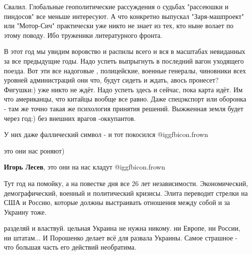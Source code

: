 \begin{itemize}
\begin{itemize}

Свалил. Глобальные геополитические рассуждения о судьбах "рассеюшки и пиндосов"
все меньше интересуют. А что конкретно выпускал "Заря-машпроект" или
"Мотор-Сич" практически уже никто не знает из тех, кто ныне волает по этому
поводу. Ибо труженики литературного фронта.

\end{itemize} %


В этот год мы увидим воровство и распилы всего и вся в масштабах невиданных за
все предыдущие годы. Надо успеть выпрыгнуть в последний вагон уходящего поезда.
Вот эти все надоговые , полицейские, военные генералы, чиновники всех уровней
администраций они что, будут сидеть и ждать, авось пронесет? Фигушки:) уже
никто не ждёт. Надо успеть здесь и сейчас, пока карта идёт. Им что американцы,
что китайцы вообще все равно. Даже спецэкспорт или оборонка - там же точно
такая же психология принятия решений. Выжженная земля будет через год:) без
внешних врагов -оккупантов.

У них даже фаллический символ - и тот покосился  @igg{fbicon.frown} 

\begin{itemize} %
это они нас роняют)

\textbf{Игорь Лесев}, это они на нас кладут  @igg{fbicon.frown} 
\end{itemize} %


Тут год на помойку, а на повестке дня все 26 лет независимости. Экономический,
демографический, военный и политический кризисы. Элита переводит стрелки на США
и Россию, которые должны выстраивать отношения между собой и за Украину тоже.


разделяй и властвуй. цельная Украина не нужна никому. ни Европе, ни России, ни
штатам... И Порошенко делает всё для развала Украины. Самое страшное - что
большая часть его действий необратима.

\end{itemize} %
